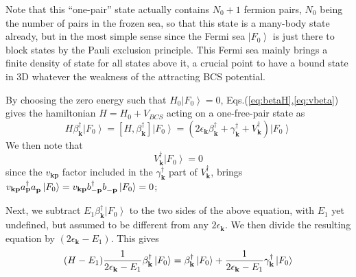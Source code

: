 \documentclass[aps,prb,superscriptaddress,showpacs,reprint,lengthcheck]{revtex4}
\newcommand{\vk}{\ensuremath{\mathbf{k}}}
\begin{document}
 Note that this ``one-pair'' state actually contains $N_0+1$ fermion pairs, 
$N_0$ being the number of pairs in the frozen sea, so that this state is a many-body state already, but in the most simple sense since the Fermi sea $%
\left|F_0\right> $ is just there to block states by the Pauli exclusion
principle. This Fermi sea mainly brings a finite density of state for all
states above it, a crucial point to have a bound state in 3D whatever the weakness of the attracting BCS potential.

By choosing the zero energy such
that $H_0\left|F_0\right> =0$, Eqs.(\ref{eq:betaH},\ref{eq:vbeta}) gives the hamiltonian $H=H_0+V_{BCS}$
acting on a one-free-pair state as 
\begin{equation}
H\beta^{\dagger}_\vk\left|F_0\right>  =\left[H,\beta^{\dagger}_\vk\right] 
\left|F_0\right> 
=\left(2\epsilon_\vk\beta^{\dagger}_\vk+\gamma^{\dagger}_\vk+V^{\dagger}_\vk%
\right) \left|F_0\right>  
\end{equation}
We then note that 
\begin{equation}\label{eq:Vk0}
V^{\dagger}_\vk\left|F_0\right> =0
\end{equation}
since the $v_{\mathbf{k} \mathbf{p} }$ factor included
in the $\gamma^{\dagger}_{\mathbf{k} }$ part of $V^{\dagger}_\vk$,  brings
 $v_{\mathbf{k} \mathbf{p} }a^{\dagger}_{\mathbf{p} }a^{}_{%
\mathbf{p} }\left|F_0\right>=v_{\mathbf{k} \mathbf{p} }b^{\dagger}_{-\mathbf{p} }b^{}_{-\mathbf{p} }\left|F_0\right>=0$;
 
Next, we subtract $E _1\beta^{\dagger}_\vk\left|F_0\right>  $ to
the two sides of the above equation, with $E_1$ yet undefined, but assumed to be different from any $2\epsilon_{\mathbf{k}}$.  We then divide the resulting equation by $%
\left(2\epsilon_\vk-E _1\right) $.  This gives
\begin{equation}  \label{eq:HE1}
 (H-E_1)\frac{1}{2\epsilon_\vk-E _1} \beta^{\dagger}_\vk%
\left|F_0\right>  =\beta^{\dagger}_\vk\left|F_0\right>  +\frac{1}{%
2\epsilon_\vk-E _1} \gamma^{\dagger}_\vk\left|F_0\right>  
\end{equation}
\end{document}
